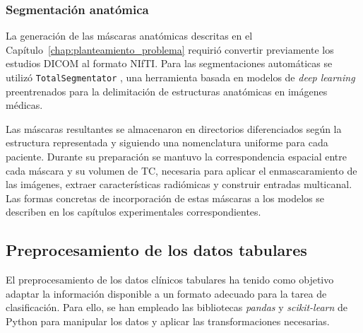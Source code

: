 
\subsubsection{Segmentación anatómica}

La generación de las máscaras anatómicas descritas en el Capítulo~\ref{chap:planteamiento_problema} requirió convertir previamente los estudios DICOM al formato NIfTI. Para las segmentaciones automáticas se utilizó \texttt{TotalSegmentator} \cite{wasserthal2023totalsegmentator}, una herramienta basada en modelos de \textit{deep learning} preentrenados para la delimitación de estructuras anatómicas en imágenes médicas.

Las máscaras resultantes se almacenaron en directorios diferenciados según la estructura representada y siguiendo una nomenclatura uniforme para cada paciente. Durante su preparación se mantuvo la correspondencia espacial entre cada máscara y su volumen de TC, necesaria para aplicar el enmascaramiento de las imágenes, extraer características radiómicas y construir entradas multicanal. Las formas concretas de incorporación de estas máscaras a los modelos se describen en los capítulos experimentales correspondientes.

\subsection{Preprocesamiento de los datos tabulares}

El preprocesamiento de los datos clínicos tabulares ha tenido como objetivo adaptar la información disponible a un formato adecuado para la tarea de clasificación. Para ello, se han empleado las bibliotecas \textit{pandas} y \textit{scikit-learn} de Python para manipular los datos y aplicar las transformaciones necesarias.

